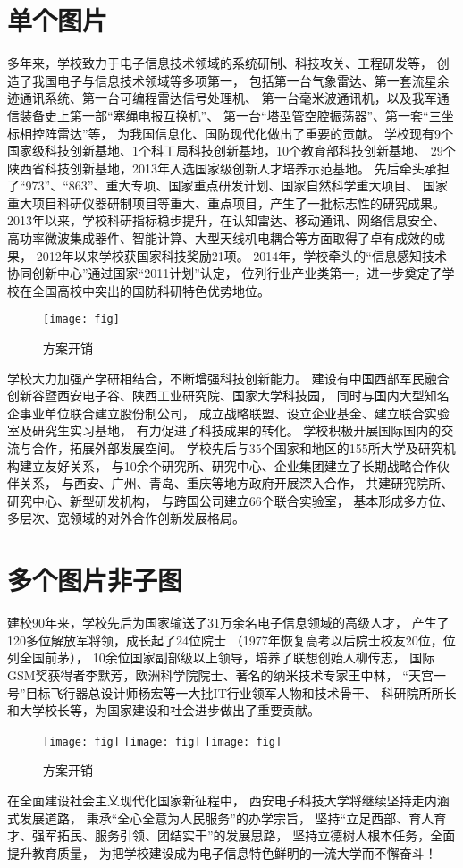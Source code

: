 \section{单个图片}
多年来，学校致力于电子信息技术领域的系统研制、科技攻关、工程研发等，
创造了我国电子与信息技术领域等多项第一，
包括第一台气象雷达、第一套流星余迹通讯系统、第一台可编程雷达信号处理机、
第一台毫米波通讯机，以及我军通信装备史上第一部“塞绳电报互换机”、
第一台“塔型管空腔振荡器”、第一套“三坐标相控阵雷达”等，
为我国信息化、国防现代化做出了重要的贡献。
学校现有9个国家级科技创新基地、1个科工局科技创新基地，10个教育部科技创新基地、
29个陕西省科技创新基地，2013年入选国家级创新人才培养示范基地。
先后牵头承担了“973”、“863”、重大专项、国家重点研发计划、国家自然科学重大项目、
国家重大项目科研仪器研制项目等重大、重点项目，产生了一批标志性的研究成果。
2013年以来，学校科研指标稳步提升，在认知雷达、移动通讯、网络信息安全、
高功率微波集成器件、智能计算、大型天线机电耦合等方面取得了卓有成效的成果，
2012年以来学校获国家科技奖励21项。
2014年，学校牵头的“信息感知技术协同创新中心”通过国家“2011计划”认定，
位列行业产业类第一，进一步奠定了学校在全国高校中突出的国防科研特色优势地位。
\begin{figure}
\centering
\texttt{[image: fig]}
\caption{方案开销}
\label{fig10}
\end{figure}
\par
学校大力加强产学研相结合，不断增强科技创新能力。
建设有中国西部军民融合创新谷暨西安电子谷、陕西工业研究院、国家大学科技园，
同时与国内大型知名企事业单位联合建立股份制公司，
成立战略联盟、设立企业基金、建立联合实验室及研究生实习基地，
有力促进了科技成果的转化。
学校积极开展国际国内的交流与合作，拓展外部发展空间。
学校先后与35个国家和地区的155所大学及研究机构建立友好关系，
与10余个研究所、研究中心、企业集团建立了长期战略合作伙伴关系，
与西安、广州、青岛、重庆等地方政府开展深入合作，
共建研究院所、研究中心、新型研发机构，
与跨国公司建立66个联合实验室，
基本形成多方位、多层次、宽领域的对外合作创新发展格局。
\section{多个图片非子图}
建校90年来，学校先后为国家输送了31万余名电子信息领域的高级人才，
产生了120多位解放军将领，成长起了24位院士
（1977年恢复高考以后院士校友20位，位列全国前茅），
10余位国家副部级以上领导，培养了联想创始人柳传志，
国际GSM奖获得者李默芳，欧洲科学院院士、著名的纳米技术专家王中林，
“天宫一号”目标飞行器总设计师杨宏等一大批IT行业领军人物和技术骨干、
科研院所所长和大学校长等，为国家建设和社会进步做出了重要贡献。
\begin{figure}
\centering
\texttt{[image: fig]}\hfil
\texttt{[image: fig]}\hfil
\texttt{[image: fig]}
\caption{方案开销}
\label{fig11}
\end{figure}
\par
在全面建设社会主义现代化国家新征程中，
西安电子科技大学将继续坚持走内涵式发展道路，
秉承“全心全意为人民服务”的办学宗旨，
坚持“立足西部、育人育才、强军拓民、服务引领、团结实干”的发展思路，
坚持立德树人根本任务，全面提升教育质量，
为把学校建设成为电子信息特色鲜明的一流大学而不懈奋斗！
